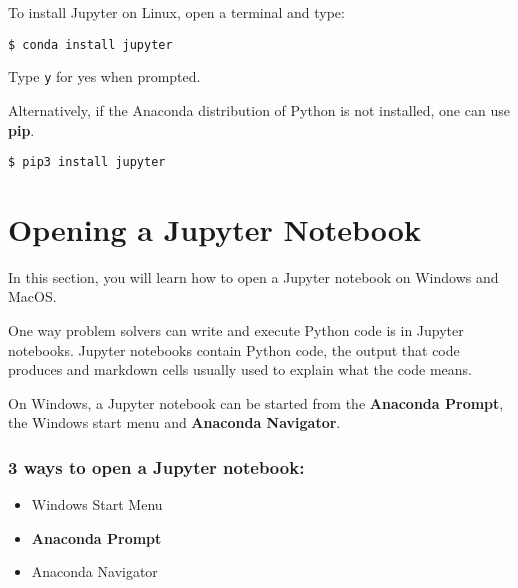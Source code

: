 \documentclass{book}
\newcommand{\passthrough}[1]{#1}
\begin{document}
To install Jupyter on Linux, open a terminal and type:

\begin{lstlisting}
$ conda install jupyter
\end{lstlisting}

Type \passthrough{\lstinline!y!} for yes when prompted.

Alternatively, if the Anaconda distribution of Python is not installed,
one can use \textbf{pip}.

\begin{lstlisting}
$ pip3 install jupyter
\end{lstlisting}
    




    
        \hypertarget{opening-a-jupyter-notebook}{%
\section{Opening a Jupyter Notebook}\label{opening-a-jupyter-notebook}}
    




    
        In this section, you will learn how to open a Jupyter notebook on
Windows and MacOS.

One way problem solvers can write and execute Python code is in Jupyter
notebooks. Jupyter notebooks contain Python code, the output that code
produces and markdown cells usually used to explain what the code means.

On Windows, a Jupyter notebook can be started from the \textbf{Anaconda
Prompt}, the Windows start menu and \textbf{Anaconda Navigator}.

\hypertarget{ways-to-open-a-jupyter-notebook}{%
\subsubsection{\texorpdfstring{3 ways to open a \textbf{Jupyter
notebook}:}{3 ways to open a Jupyter notebook:}}\label{ways-to-open-a-jupyter-notebook}}

\begin{itemize}
\item
  Windows Start Menu
\item
  \textbf{Anaconda Prompt}
\item
  Anaconda Navigator
\end{itemize}
    
\end{document}

